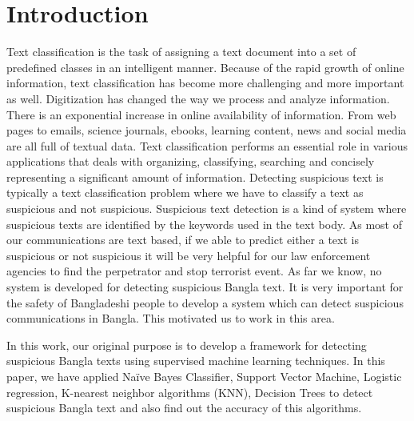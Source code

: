 \section{\textbf{Introduction}}
Text classification is the task of assigning a text document into a set of predefined classes in an intelligent manner. Because of the rapid growth of online information, text classification has become more challenging and more important as well. Digitization has changed
the way we process and analyze information. There is an exponential increase in online availability of information. From web pages to emails, science journals, ebooks, learning content, news and social media are all full of textual data. Text classification performs an essential role in various applications that deals with organizing, classifying, searching and concisely representing a significant amount of information. Detecting suspicious text is typically a text classification problem where we have to classify a text as suspicious and not suspicious. Suspicious text detection is a kind of system where suspicious texts are identified by the keywords used in the text body. As most of our communications are text based, if we able to predict either a text is suspicious or not suspicious it will be very helpful for our law enforcement agencies to find the perpetrator and stop terrorist event. As far we know, no system is developed for detecting suspicious Bangla text. It is very important for the safety of Bangladeshi people to develop a system which can detect suspicious communications in Bangla. This motivated us to work in this area.

In this work, our original purpose is to develop a framework for detecting suspicious Bangla texts using supervised machine learning techniques. In this paper, we have applied Naïve Bayes Classifier\cite{yoo2015classification}, Support Vector Machine\cite{wei2012text}, Logistic regression\cite{sharma2015active}, K-nearest neighbor algorithms (KNN)\cite{harisinghaney2014text}, Decision Trees\cite{chavan2014survey} to detect suspicious Bangla text and also find out the accuracy of this algorithms.